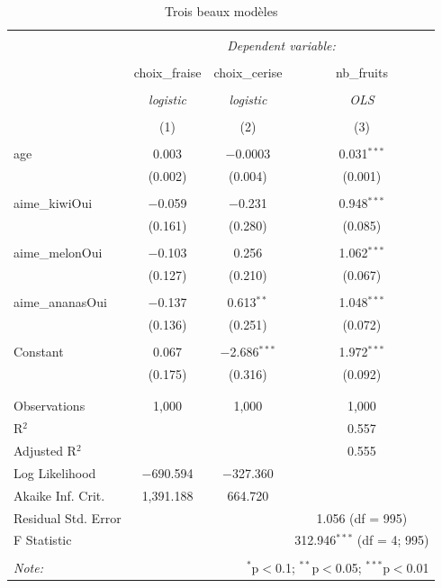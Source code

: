 \documentclass[a4paper, 10pt]{article}\usepackage[]{graphicx}\usepackage[]{xcolor}
\begin{document}
\begin{table}[!htbp] \centering 
  \caption{Trois beaux modèles} 
  \label{} 
\begin{tabular}{@{\extracolsep{5pt}}lccc} 
\\[-1.8ex]\hline 
\hline \\[-1.8ex] 
 & \multicolumn{3}{c}{\textit{Dependent variable:}} \\ 
\cline{2-4} 
\\[-1.8ex] & choix\_fraise & choix\_cerise & nb\_fruits \\ 
\\[-1.8ex] & \textit{logistic} & \textit{logistic} & \textit{OLS} \\ 
\\[-1.8ex] & (1) & (2) & (3)\\ 
\hline \\[-1.8ex] 
 age & 0.003 & $-$0.0003 & 0.031$^{***}$ \\ 
  & (0.002) & (0.004) & (0.001) \\ 
  & & & \\ 
 aime\_kiwiOui & $-$0.059 & $-$0.231 & 0.948$^{***}$ \\ 
  & (0.161) & (0.280) & (0.085) \\ 
  & & & \\ 
 aime\_melonOui & $-$0.103 & 0.256 & 1.062$^{***}$ \\ 
  & (0.127) & (0.210) & (0.067) \\ 
  & & & \\ 
 aime\_ananasOui & $-$0.137 & 0.613$^{**}$ & 1.048$^{***}$ \\ 
  & (0.136) & (0.251) & (0.072) \\ 
  & & & \\ 
 Constant & 0.067 & $-$2.686$^{***}$ & 1.972$^{***}$ \\ 
  & (0.175) & (0.316) & (0.092) \\ 
  & & & \\ 
\hline \\[-1.8ex] 
Observations & 1,000 & 1,000 & 1,000 \\ 
R$^{2}$ &  &  & 0.557 \\ 
Adjusted R$^{2}$ &  &  & 0.555 \\ 
Log Likelihood & $-$690.594 & $-$327.360 &  \\ 
Akaike Inf. Crit. & 1,391.188 & 664.720 &  \\ 
Residual Std. Error &  &  & 1.056 (df = 995) \\ 
F Statistic &  &  & 312.946$^{***}$ (df = 4; 995) \\ 
\hline 
\hline \\[-1.8ex] 
\textit{Note:}  & \multicolumn{3}{r}{$^{*}$p$<$0.1; $^{**}$p$<$0.05; $^{***}$p$<$0.01} \\ 
\end{tabular} 
\end{table} 
\end{document}

